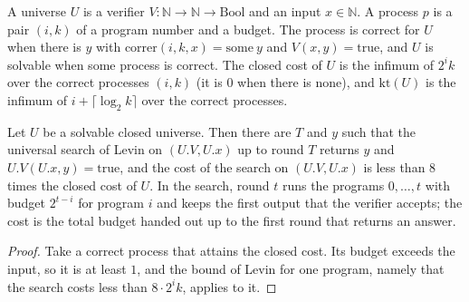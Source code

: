 \begin{definition}
  \label{def:information-closed-universe}
  \leanok
  A universe $U$ is a verifier $V : \mathbb{N} \to \mathbb{N} \to \mathrm{Bool}$ and an input
  $x \in \mathbb{N}$. A process $p$ is a pair $(i, k)$ of a program number and a budget. The process
  is correct for $U$ when there is $y$ with $\mathrm{correr}(i, k, x) = \mathrm{some}\ y$ and
  $V(x, y) = \mathrm{true}$, and $U$ is solvable when some process is correct. The closed cost of
  $U$ is the infimum of $2^i k$ over the correct processes $(i, k)$ (it is $0$ when there is none),
  and $\mathrm{kt}(U)$ is the infimum of $i + \lceil \log_2 k \rceil$ over the correct processes.
  \own{}
\end{definition}

\begin{theorem}
  \label{thm:information-closed-law}
  \leanok
  Let $U$ be a solvable closed universe. Then there are $T$ and $y$ such that the universal search
  of Levin on $(U.V, U.x)$ up to round $T$ returns $y$ and $U.V(U.x, y) = \mathrm{true}$, and the
  cost of the search on $(U.V, U.x)$ is less than $8$ times the closed cost of $U$. In the search,
  round $t$ runs the programs $0, \dots, t$ with budget $2^{t - i}$ for program $i$ and keeps the
  first output that the verifier accepts; the cost is the total budget handed out up to the first
  round that returns an answer.
  \own{}
\end{theorem}

\begin{proof}
  \leanok
  Take a correct process that attains the closed cost. Its budget exceeds the input, so it is at
  least $1$, and the bound of Levin for one program, namely that the search costs less than
  $8 \cdot 2^i k$, applies to it.
\end{proof}

